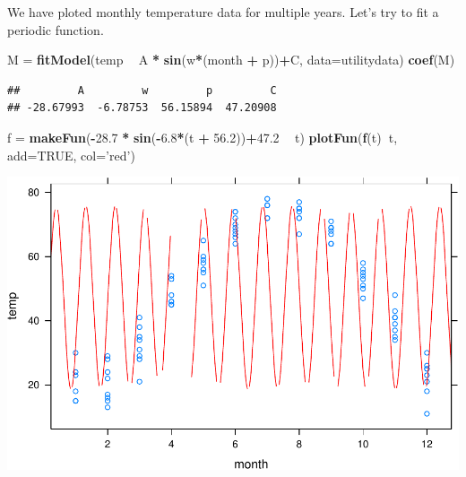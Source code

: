 \documentclass[
]{book}
\newenvironment{Shaded}{\begin{snugshade}}{\end{snugshade}}
\newcommand{\DataTypeTok}[1]{\textcolor[rgb]{0.13,0.29,0.53}{#1}}
\newcommand{\FloatTok}[1]{\textcolor[rgb]{0.00,0.00,0.81}{#1}}
\newcommand{\KeywordTok}[1]{\textcolor[rgb]{0.13,0.29,0.53}{\textbf{#1}}}
\newcommand{\NormalTok}[1]{#1}
\newcommand{\OperatorTok}[1]{\textcolor[rgb]{0.81,0.36,0.00}{\textbf{#1}}}
\newcommand{\OtherTok}[1]{\textcolor[rgb]{0.56,0.35,0.01}{#1}}
\newcommand{\StringTok}[1]{\textcolor[rgb]{0.31,0.60,0.02}{#1}}
\begin{document}
We have ploted monthly temperature data for multiple years. Let's try to fit a periodic function.

\begin{Shaded}
\begin{Highlighting}[]
\NormalTok{M =}\StringTok{ }\KeywordTok{fitModel}\NormalTok{(temp }\OperatorTok{~}\StringTok{ }\NormalTok{A }\OperatorTok{*}\StringTok{ }\KeywordTok{sin}\NormalTok{(w}\OperatorTok{*}\NormalTok{(month }\OperatorTok{+}\StringTok{ }\NormalTok{p))}\OperatorTok{+}\NormalTok{C, }\DataTypeTok{data=}\NormalTok{utilitydata)}
\KeywordTok{coef}\NormalTok{(M)}
\end{Highlighting}
\end{Shaded}

\begin{verbatim}
##         A         w         p         C 
## -28.67993  -6.78753  56.15894  47.20908
\end{verbatim}

\begin{Shaded}
\begin{Highlighting}[]
\NormalTok{f =}\StringTok{ }\KeywordTok{makeFun}\NormalTok{(}\OperatorTok{-}\FloatTok{28.7} \OperatorTok{*}\StringTok{ }\KeywordTok{sin}\NormalTok{(}\OperatorTok{-}\FloatTok{6.8}\OperatorTok{*}\NormalTok{(t }\OperatorTok{+}\StringTok{ }\FloatTok{56.2}\NormalTok{))}\OperatorTok{+}\FloatTok{47.2} \OperatorTok{~}\StringTok{ }\NormalTok{t)}
\KeywordTok{plotFun}\NormalTok{(}\KeywordTok{f}\NormalTok{(t)}\OperatorTok{~}\NormalTok{t, }\DataTypeTok{add=}\OtherTok{TRUE}\NormalTok{, }\DataTypeTok{col=}\StringTok{'red'}\NormalTok{)}
\end{Highlighting}
\end{Shaded}

\includegraphics{_bookdown_files/math135_handbook_files/figure-latex/unnamed-chunk-41-1.pdf}
\end{document}
